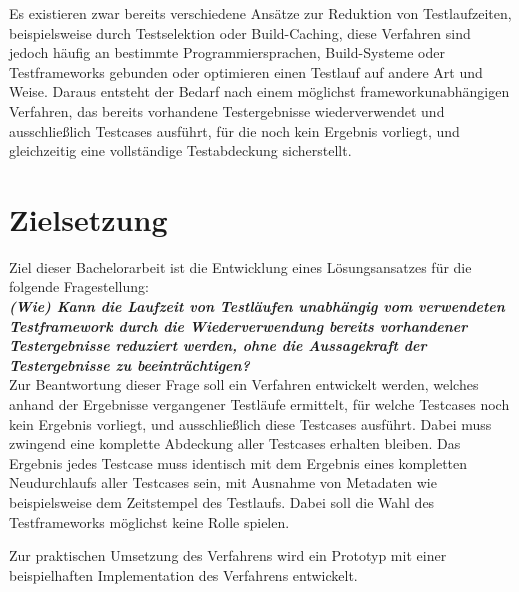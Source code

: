Es existieren zwar bereits verschiedene Ansätze zur Reduktion von Testlaufzeiten, beispielsweise durch Testselektion oder Build-Caching, diese Verfahren sind jedoch häufig an bestimmte Programmiersprachen, Build-Systeme oder Testframeworks gebunden oder optimieren einen Testlauf auf andere Art und Weise. Daraus entsteht der Bedarf nach einem möglichst frameworkunabhängigen Verfahren, das bereits vorhandene Testergebnisse wiederverwendet und ausschließlich Testcases ausführt, für die noch kein Ergebnis vorliegt, und gleichzeitig eine vollständige Testabdeckung sicherstellt.

\section{Zielsetzung}\label{Zielsetzung}

Ziel dieser Bachelorarbeit ist die Entwicklung eines Lösungsansatzes für die folgende Fragestellung:\\
\textit{\textbf{(Wie) Kann die Laufzeit von Testläufen unabhängig vom verwendeten Testframework durch die Wiederverwendung bereits vorhandener Testergebnisse reduziert werden, ohne die Aussagekraft der Testergebnisse zu beeinträchtigen?}}\\
Zur Beantwortung dieser Frage soll ein Verfahren entwickelt werden, welches anhand der Ergebnisse vergangener Testläufe ermittelt, für welche Testcases noch kein Ergebnis vorliegt, und ausschließlich diese Testcases ausführt. Dabei muss zwingend eine komplette Abdeckung aller Testcases erhalten bleiben. Das Ergebnis jedes Testcase muss identisch mit dem Ergebnis eines kompletten Neudurchlaufs aller Testcases sein, mit Ausnahme von Metadaten wie beispielsweise dem Zeitstempel des Testlaufs. Dabei soll die Wahl des Testframeworks möglichst keine Rolle spielen.

Zur praktischen Umsetzung des Verfahrens wird ein Prototyp mit einer beispielhaften Implementation des Verfahrens entwickelt. 

